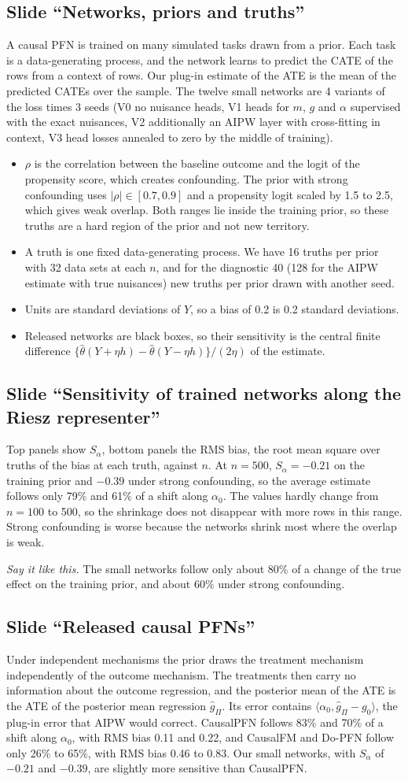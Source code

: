 \documentclass[10pt]{article}
\newcommand{\slide}[1]{\subsection*{Slide ``#1''}}
\newcommand{\say}[1]{\par\textit{Say it like this.} #1\par}
\begin{document}
\slide{Networks, priors and truths}
A causal PFN is trained on many simulated tasks drawn from a prior. Each task is a data-generating process, and the
network learns to predict the CATE of the rows from a context of rows. Our plug-in estimate of the ATE is the mean of
the predicted CATEs over the sample. The twelve small networks are 4 variants of the loss times 3 seeds (V0 no
nuisance heads, V1 heads for $m$, $g$ and $\alpha$ supervised with the exact nuisances, V2 additionally an AIPW layer
with cross-fitting in context, V3 head losses annealed to zero by the middle of training).
\begin{itemize}
\item $\rho$ is the correlation between the baseline outcome and the logit of the propensity score, which creates
confounding. The prior with strong confounding uses $|\rho|\in[0.7,0.9]$ and a propensity logit scaled by 1.5 to 2.5,
which gives weak overlap. Both ranges lie inside the training prior, so these truths are a hard region of the prior
and not new territory.
\item A truth is one fixed data-generating process. We have 16 truths per prior with 32 data sets at each $n$, and for
the diagnostic 40 (128 for the AIPW estimate with true nuisances) new truths per prior drawn with another seed.
\item Units are standard deviations of $Y$, so a bias of 0.2 is 0.2 standard deviations.
\item Released networks are black boxes, so their sensitivity is the central finite difference
$\{\hat\theta(Y+\eta h)-\hat\theta(Y-\eta h)\}/(2\eta)$ of the estimate.
\end{itemize}

\slide{Sensitivity of trained networks along the Riesz representer}
Top panels show $S_\alpha$, bottom panels the RMS bias, the root mean square over truths of the bias at each truth,
against $n$. At $n=500$, $S_\alpha=-0.21$ on the training prior and $-0.39$ under strong confounding, so the average
estimate follows only 79\% and 61\% of a shift along $\alpha_0$. The values hardly change from $n=100$ to 500, so the
shrinkage does not disappear with more rows in this range. Strong confounding is worse because the networks shrink
most where the overlap is weak.
\say{The small networks follow only about 80\% of a change of the true effect on the training prior, and about 60\%
under strong confounding.}

\slide{Released causal PFNs}
Under independent mechanisms the prior draws the treatment mechanism independently of the outcome mechanism. The
treatments then carry no information about the outcome regression, and the posterior mean of the ATE is the ATE of the
posterior mean regression $\hat g_\Pi$. Its error contains $\langle\alpha_0,\hat g_\Pi-g_0\rangle$, the plug-in error
that AIPW would correct. CausalPFN follows 83\% and 70\% of a shift along $\alpha_0$, with RMS bias 0.11 and 0.22, and
CausalFM and Do-PFN follow only 26\% to 65\%, with RMS bias 0.46 to 0.83. Our small networks, with $S_\alpha$ of
$-0.21$ and $-0.39$, are slightly more sensitive than CausalPFN.
\end{document}
